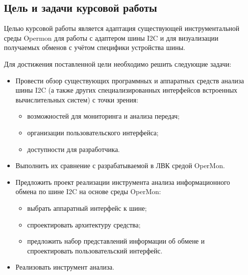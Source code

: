 \subsection*{Цель и задачи курсовой работы}

Целью курсовой работы является адаптация существующей инструментальной среды Opermon для работы с адаптером шины I2C и для визуализации  получаемых обменов с учётом специфики устройства шины.

Для достижения поставленной цели необходимо решить следующие задачи:

\begin{itemize}
 \item Провести обзор существующих программных и аппаратных средств анализа шины I2C (а также других специализированных интерфейсов встроенных вычислительных систем) с точки зрения:
 
 \begin{itemize}
  \item возможностей для мониторинга и анализа передач;
  \item организации пользовательского интерфейса;
  \item доступности для разработчика.
 \end{itemize}
 
 \item Выполнить их сравнение с разрабатываемой в ЛВК средой OperMon.
 
 \item Предложить проект реализации инструмента анализа информационного обмена по шине I2C на основе среды OperMon:
 
 \begin{itemize}
  \item выбрать аппаратный интерфейс к шине;
  \item спроектировать архитектуру средства;
  \item предложить набор представлений информации об обмене и спроектировать пользовательский интерфейс.
 \end{itemize}

 
 \item Реализовать инструмент анализа.
 
\end{itemize}
